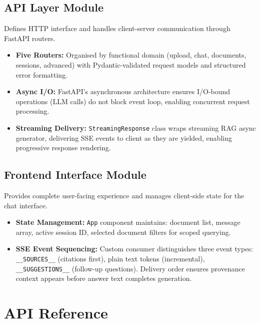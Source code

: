 \subsection{API Layer Module}

Defines HTTP interface and handles client-server communication through FastAPI routers.

\begin{itemize}
\item \textbf{Five Routers:} Organised by functional domain (upload, chat, documents, sessions, advanced) with Pydantic-validated request models and structured error formatting.

\item \textbf{Async I/O:} FastAPI's asynchronous architecture ensures I/O-bound operations (LLM calls) do not block event loop, enabling concurrent request processing.

\item \textbf{Streaming Delivery:} \texttt{StreamingResponse} class wraps streaming RAG async generator, delivering SSE events to client as they are yielded, enabling progressive response rendering.
\end{itemize}

\subsection{Frontend Interface Module}

Provides complete user-facing experience and manages client-side state for the chat interface.

\begin{itemize}
\item \textbf{State Management:} \texttt{App} component maintains: document list, message array, active session ID, selected document filters for scoped querying.

\item \textbf{SSE Event Sequencing:} Custom consumer distinguishes three event types: \texttt{\_\_SOURCES\_\_} (citations first), plain text tokens (incremental), \texttt{\_\_SUGGESTIONS\_\_} (follow-up questions). Delivery order ensures provenance context appears before answer text completes generation.
\end{itemize}

\section{API Reference}

